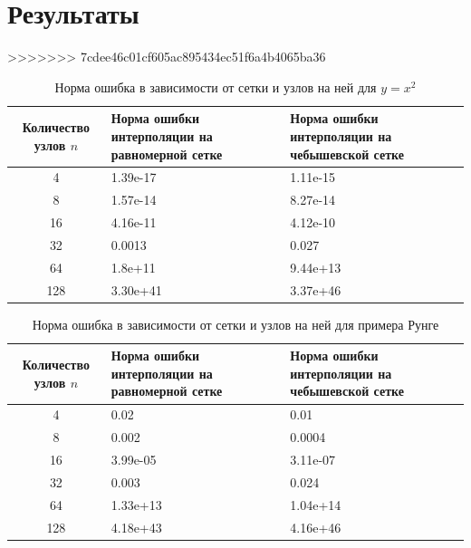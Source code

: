 \documentclass{article}
\begin{document}
    \section{Результаты}
>>>>>>> 7cdee46c01cf605ac895434ec51f6a4b4065ba36

    
    \begin{table}[H]
        \centering
        \caption{Норма ошибка в зависимости от сетки и узлов на ней для $y = x^2$}
        \begin{tabular}{|c|p{5cm}|p{5cm}|}
            \hline
            Количество узлов $n$ & Норма ошибки интерполяции
            на равномерной сетке & Норма ошибки интерполяции
            на чебышевской сетке \\
            \hline 
            4 & 1.39e-17 & 1.11e-15 \\ \hline
            8 & 1.57e-14 & 8.27e-14\\ \hline
            16 &4.16e-11 & 4.12e-10\\ \hline
            32 & 0.0013 &  0.027\\ \hline
            64 &1.8e+11 & 9.44e+13\\ \hline
            128 &3.30e+41&   3.37e+46\\ \hline
        \end{tabular}
    \end{table}
    \begin{table}[H]
        \centering
        \caption{Норма ошибка в зависимости от сетки и узлов на ней для примера Рунге}
        \begin{tabular}{|c|p{5cm}|p{5cm}|}
            \hline
            Количество узлов $n$ & Норма ошибки интерполяции
            на равномерной сетке & Норма ошибки интерполяции
            на чебышевской сетке \\
            \hline 
            4 & 0.02 &   0.01 \\ \hline
            8 & 0.002 & 0.0004\\ \hline
            16 &3.99e-05 & 3.11e-07\\ \hline
            32 &  0.003 &  0.024\\ \hline
            64 &1.33e+13 & 1.04e+14\\ \hline
            128 & 4.18e+43&   4.16e+46\\ \hline
        \end{tabular}
    \end{table}
\end{document}
